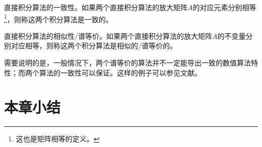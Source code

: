 \begin{definition}
直接积分算法的一致性\cite{Hoff1988c}。如果两个直接积分算法的放大矩阵$A$的对应元素分别相等\footnote{这也是矩阵相等的定义。}，则称这两个积分算法是一致的。
\end{definition}

\begin{definition}
直接积分算法的相似性/谱等价\cite{Hoff1988c}。如果两个直接积分算法的放大矩阵$A$的不变量分别对应相等，则称这两个积分算法是相似的/谱等价的。
\end{definition}

需要说明的是，一般情况下，两个谱等价的算法并不一定能导出一致的数值算法特性；而两个算法的一致性可以保证。这样的例子可以参见文献。

\section{本章小结}



